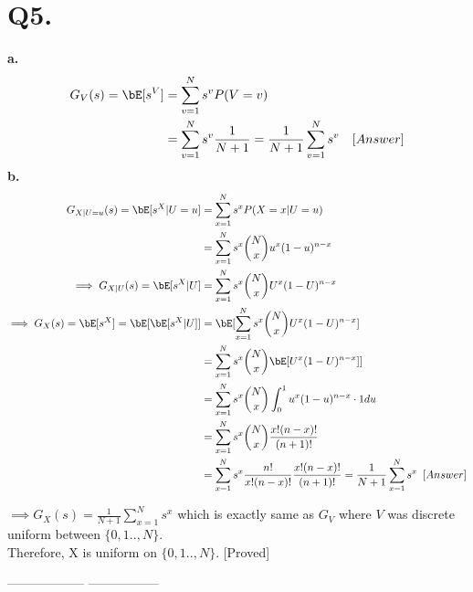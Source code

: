 \documentclass[a4paper,11pt]{article}
\begin{document}
\section*{Q5.}
\textbf{a.}\\
\begin{align*}
 G_V(s) = \bE[s^V] &= \sum_{v=1}^{N}s^vP(V=v)\\
 &= \sum_{v=1}^{N}s^v\frac{1}{N+1} = \frac{1}{N+1}\sum_{v=1}^{N}s^v \hspace{10pt} [Answer]
\end{align*}
\textbf{b.}\\
\begin{align*}
 G_{X|U=u}(s) = \bE[s^X | U=u] &= \sum_{x=1}^{N}s^xP(X=x  |U = u)\\
 &= \sum_{x=1}^{N}s^x \binom{N}{x}u^x(1-u)^{n-x}\\
\implies G_{X|U}(s) = \bE[s^X | U] &= \sum_{x=1}^{N}s^x \binom{N}{x}U^x(1-U)^{n-x}\\
\implies G_{X}(s) = \bE[s^X] = \bE[\bE[s^X | U]] &= \bE[\sum_{x=1}^{N}s^x \binom{N}{x}U^x(1-U)^{n-x}]\\
&= \sum_{x=1}^{N}s^x \binom{N}{x}\bE[U^x(1-U)^{n-x}]] \\
&= \sum_{x=1}^{N}s^x \binom{N}{x} \int_{0}^{1}u^{x}(1-u)^{n-x}\cdot 1 du\\
&=  \sum_{x=1}^{N}s^x \binom{N}{x} \frac{x!(n-x)!}{(n+1)!}\\
&= \sum_{x=1}^{N}s^x \frac{n!}{x!(n-x)!}\frac{x!(n-x)!}{(n+1)!} = \frac{1}{N+1}\sum_{x=1}^{N}s^x \hspace{5pt}[Answer]\\
\end{align*}

$\implies G_{X}(s) = \frac{1}{N+1}\sum_{x=1}^{N}s^x$ which is exactly same as $G_V$ where $V$ was discrete uniform between $\{0,1..,N\}$.\\
Therefore, X is uniform on $\{0,1..,N\}$. [Proved]



\begin{center}

 ------------------ -----------------
\end{center}
\end{document}
